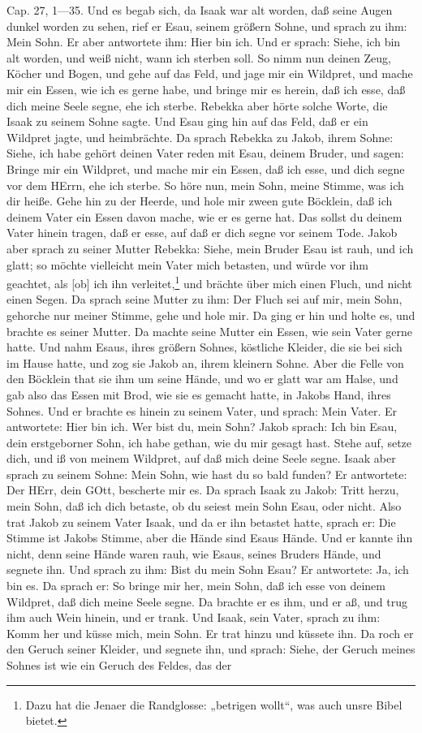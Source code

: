 Cap. 27, 1—35. Und es begab sich, da Isaak war alt worden, daß seine Augen dunkel worden zu sehen, rief er Esau, seinem größern Sohne, und sprach zu ihm: Mein Sohn. Er aber antwortete ihm: Hier bin ich. Und er sprach: Siehe, ich bin alt worden, und weiß nicht, wann ich sterben soll. So nimm nun deinen Zeug, Köcher und Bogen, und gehe auf das Feld, und jage mir ein Wildpret, und mache mir ein Essen, wie ich es gerne habe, und bringe mir es herein, daß ich esse, daß dich meine Seele segne, ehe ich sterbe. Rebekka aber hörte solche Worte, die Isaak zu seinem Sohne sagte. Und Esau ging hin auf das Feld, daß er ein Wildpret jagte, und heimbrächte. Da sprach Rebekka zu Jakob, ihrem Sohne: Siehe, ich habe gehört deinen Vater reden mit Esau, deinem Bruder, und sagen: Bringe mir ein Wildpret, und mache mir ein Essen, daß ich esse, und dich segne vor dem HErrn, ehe ich sterbe. So höre nun, mein Sohn, meine Stimme, was ich dir heiße. Gehe hin zu der Heerde, und hole mir zween gute Böcklein, daß ich deinem Vater ein Essen davon mache, wie er es gerne hat. Das sollst du deinem Vater hinein tragen, daß er esse, auf daß er dich segne vor seinem Tode. Jakob aber sprach zu seiner Mutter Rebekka: Siehe, mein Bruder Esau ist rauh, und ich glatt; so möchte vielleicht mein Vater mich betasten, und würde vor ihm geachtet, als [ob] ich ihn verleitet,\footnote{Dazu hat die Jenaer die Randglosse: „betrigen wollt“, was auch unsre Bibel bietet.} und brächte über mich einen Fluch, und nicht einen Segen. Da sprach seine Mutter zu ihm: Der Fluch sei auf mir, mein Sohn, gehorche nur meiner Stimme, gehe und hole mir. Da ging er hin und holte es, und brachte es seiner Mutter. Da machte seine Mutter ein Essen, wie sein Vater gerne hatte. Und nahm Esaus, ihres größern Sohnes, köstliche Kleider, die sie bei sich im Hause hatte, und zog sie Jakob an, ihrem kleinern Sohne. Aber die Felle von den Böcklein that sie ihm um seine Hände, und wo er glatt war am Halse, und gab also das Essen mit Brod, wie sie es gemacht hatte, in Jakobs Hand, ihres Sohnes. Und er brachte es hinein zu seinem Vater, und sprach: Mein Vater. Er antwortete: Hier bin ich. Wer bist du, mein Sohn? Jakob sprach: Ich bin Esau, dein erstgeborner Sohn, ich habe gethan, wie du mir gesagt hast. Stehe auf, setze dich, und iß von meinem Wildpret, auf daß mich deine Seele segne. Isaak aber sprach zu seinem Sohne: Mein Sohn, wie hast du so bald funden? Er antwortete: Der HErr, dein GOtt, bescherte mir es. Da sprach Isaak zu Jakob: Tritt herzu, mein Sohn, daß ich dich betaste, ob du seiest mein Sohn Esau, oder nicht. Also trat Jakob zu seinem Vater Isaak, und da er ihn betastet hatte, sprach er: Die Stimme ist Jakobs Stimme, aber die Hände sind Esaus Hände. Und er kannte ihn nicht, denn seine Hände waren rauh, wie Esaus, seines Bruders Hände, und segnete ihn. Und sprach zu ihm: Bist du mein Sohn Esau? Er antwortete: Ja, ich bin es. Da sprach er: So bringe mir her, mein Sohn, daß ich esse von deinem Wildpret, daß dich meine Seele segne. Da brachte er es ihm, und er aß, und trug ihm auch Wein hinein, und er trank. Und Isaak, sein Vater, sprach zu ihm: Komm her und küsse mich, mein Sohn. Er trat hinzu und küssete ihn. Da roch er den Geruch seiner Kleider, und segnete ihn, und sprach: Siehe, der Geruch meines Sohnes ist wie ein Geruch des Feldes, das der 